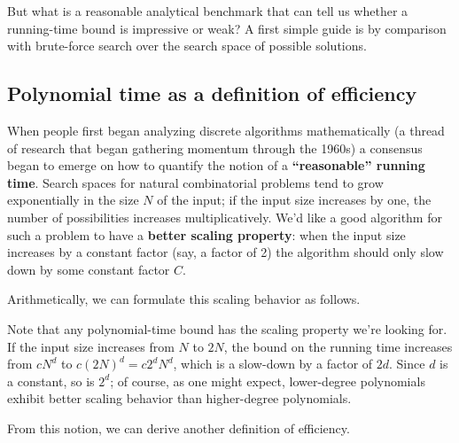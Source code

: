 But what is a reasonable analytical benchmark that can tell us whether a running-time bound is impressive or weak? A first simple guide is by comparison with brute-force search over the search space of possible solutions.


\subsection{Polynomial time as a definition of efficiency}
When people first began analyzing discrete algorithms mathematically (a thread of research that began gathering momentum through the 1960s) a consensus began to emerge on how to quantify the notion of a \textbf{“reasonable” running time}. Search spaces for natural combinatorial problems tend to grow exponentially in the size $N$ of the input; if the input size increases by one, the number of possibilities increases multiplicatively. We’d like a good algorithm for such a problem to have a \textbf{better scaling property}: when the input size increases by a constant factor (say, a factor of 2) the algorithm should only slow down by some constant factor $C$.

Arithmetically, we can formulate this scaling behavior as follows.


Note that any polynomial-time bound has the scaling property we’re looking for. If the input size increases from $N$ to $2N$, the bound on the running time increases from $c N^d$ to $c(2N)^d = c  2^d N^d$, which is a slow-down by a factor of $2d$. Since $d$ is a constant, so is $2^d$; of course, as one might expect, lower-degree polynomials exhibit better scaling behavior than higher-degree polynomials.

From this notion, we can derive another definition of efficiency.


